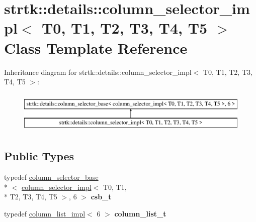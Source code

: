 \hypertarget{classstrtk_1_1details_1_1column__selector__impl_3_01T0_00_01T1_00_01T2_00_01T3_00_01T4_00_01T5_01_4}{\section{strtk\-:\-:details\-:\-:column\-\_\-selector\-\_\-impl$<$ T0, T1, T2, T3, T4, T5 $>$ Class Template Reference}
\label{classstrtk_1_1details_1_1column__selector__impl_3_01T0_00_01T1_00_01T2_00_01T3_00_01T4_00_01T5_01_4}
}
Inheritance diagram for strtk\-:\-:details\-:\-:column\-\_\-selector\-\_\-impl$<$ T0, T1, T2, T3, T4, T5 $>$\-:\begin{figure}[H]
\begin{center}
\leavevmode
\includegraphics[height=2.000000cm]{classstrtk_1_1details_1_1column__selector__impl_3_01T0_00_01T1_00_01T2_00_01T3_00_01T4_00_01T5_01_4}
\end{center}
\end{figure}
\subsection*{Public Types}
\begin{DoxyCompactItemize}
\item 
\hypertarget{classstrtk_1_1details_1_1column__selector__impl_3_01T0_00_01T1_00_01T2_00_01T3_00_01T4_00_01T5_01_4_adb288ee4815fd4e354dd5aeebbc94a3f}{typedef \hyperlink{classstrtk_1_1details_1_1column__selector__base}{column\-\_\-selector\-\_\-base}\\*
$<$ \hyperlink{classstrtk_1_1details_1_1column__selector__impl}{column\-\_\-selector\-\_\-impl}$<$ T0, T1, \\*
T2, T3, T4, T5 $>$, 6 $>$ {\bfseries csb\-\_\-t}}\label{classstrtk_1_1details_1_1column__selector__impl_3_01T0_00_01T1_00_01T2_00_01T3_00_01T4_00_01T5_01_4_adb288ee4815fd4e354dd5aeebbc94a3f}

\item 
\hypertarget{classstrtk_1_1details_1_1column__selector__impl_3_01T0_00_01T1_00_01T2_00_01T3_00_01T4_00_01T5_01_4_aeba25d7d9ee63caa2e614b3ffedc5304}{typedef \hyperlink{structstrtk_1_1details_1_1column__list__impl}{column\-\_\-list\-\_\-impl}$<$ 6 $>$ {\bfseries column\-\_\-list\-\_\-t}}\label{classstrtk_1_1details_1_1column__selector__impl_3_01T0_00_01T1_00_01T2_00_01T3_00_01T4_00_01T5_01_4_aeba25d7d9ee63caa2e614b3ffedc5304}

\end{DoxyCompactItemize}
